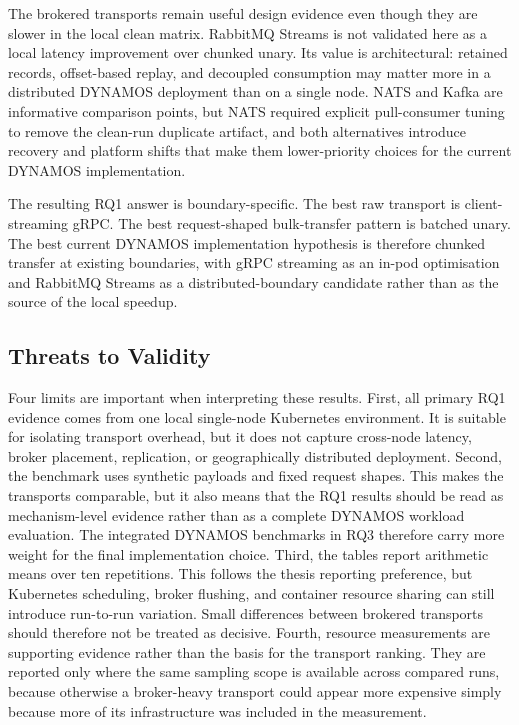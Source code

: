 The brokered transports remain useful design evidence even though they are slower in the local clean matrix. RabbitMQ Streams is not validated here as a local latency improvement over chunked unary. Its value is architectural: retained records, offset-based replay, and decoupled consumption may matter more in a distributed DYNAMOS deployment than on a single node. NATS and Kafka are informative comparison points, but NATS required explicit pull-consumer tuning to remove the clean-run duplicate artifact, and both alternatives introduce recovery and platform shifts that make them lower-priority choices for the current DYNAMOS implementation.

The resulting RQ1 answer is boundary-specific. The best raw transport is client-streaming gRPC. The best request-shaped bulk-transfer pattern is batched unary. The best current DYNAMOS implementation hypothesis is therefore chunked transfer at existing boundaries, with gRPC streaming as an in-pod optimisation and RabbitMQ Streams as a distributed-boundary candidate rather than as the source of the local speedup.

\subsection{Threats to Validity}

Four limits are important when interpreting these results. First, all primary RQ1 evidence comes from one local single-node Kubernetes environment. It is suitable for isolating transport overhead, but it does not capture cross-node latency, broker placement, replication, or geographically distributed deployment. Second, the benchmark uses synthetic payloads and fixed request shapes. This makes the transports comparable, but it also means that the RQ1 results should be read as mechanism-level evidence rather than as a complete DYNAMOS workload evaluation. The integrated DYNAMOS benchmarks in RQ3 therefore carry more weight for the final implementation choice. Third, the tables report arithmetic means over ten repetitions. This follows the thesis reporting preference, but Kubernetes scheduling, broker flushing, and container resource sharing can still introduce run-to-run variation. Small differences between brokered transports should therefore not be treated as decisive. Fourth, resource measurements are supporting evidence rather than the basis for the transport ranking. They are reported only where the same sampling scope is available across compared runs, because otherwise a broker-heavy transport could appear more expensive simply because more of its infrastructure was included in the measurement.

\clearpage
